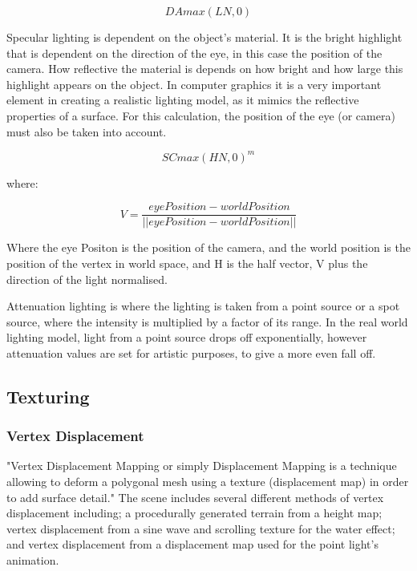 \documentclass[conference]{acmsiggraph}
\begin{document}
\begin{equation} \label{diffuseLightingEq}
	DA max(L N, 0)
\end{equation}
	
Specular lighting is dependent on the object's material. It is the bright highlight that is dependent on the direction of the eye, in this case the position of the camera. How reflective the material is depends on how bright and how large this highlight appears on the object. In computer graphics it is a very important element in creating a realistic lighting model, as it mimics the reflective properties of a surface. %
For this calculation, the position of the eye (or camera) must also be taken into account. 
	
\begin{equation}
	SC max(H N, 0)^m
\end{equation}
	
where:
	
\begin{equation} 
	V = \frac{eyePosition - worldPosition}{||eyePosition - worldPosition||}
\end{equation}
	
Where the eye Positon is the position of the camera, and the world position is the position of the vertex in world space, and H is the half vector, V plus the direction of the light normalised.

Attenuation lighting is where the lighting is taken from a point source or a spot source, where the intensity is multiplied by a factor of its range. In the real world lighting model, light from a point source drops off exponentially, however attenuation values are set for artistic purposes, to give a more even fall off. 
	
\subsection{Texturing}

\subsubsection{Vertex Displacement}
	
"Vertex Displacement Mapping or simply Displacement Mapping is a technique allowing to deform a polygonal mesh using a texture (displacement map) in order to add surface detail." \cite{Guinot} The scene includes several different methods of vertex displacement including; a procedurally generated terrain from a height map; vertex displacement from a sine wave and scrolling texture for the water effect; and vertex displacement from a displacement map used for the point light's animation.
\end{document}
